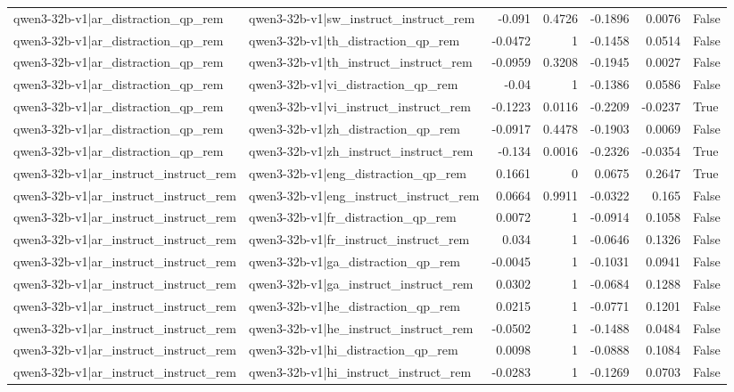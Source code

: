 \begin{table}
\begin{tabular}{l l r r r r l}
qwen3-32b-v1|ar_distraction_qp_rem & qwen3-32b-v1|sw_instruct_instruct_rem & -0.091 & 0.4726 & -0.1896 & 0.0076 & False \\
qwen3-32b-v1|ar_distraction_qp_rem & qwen3-32b-v1|th_distraction_qp_rem & -0.0472 & 1 & -0.1458 & 0.0514 & False \\
qwen3-32b-v1|ar_distraction_qp_rem & qwen3-32b-v1|th_instruct_instruct_rem & -0.0959 & 0.3208 & -0.1945 & 0.0027 & False \\
qwen3-32b-v1|ar_distraction_qp_rem & qwen3-32b-v1|vi_distraction_qp_rem & -0.04 & 1 & -0.1386 & 0.0586 & False \\
qwen3-32b-v1|ar_distraction_qp_rem & qwen3-32b-v1|vi_instruct_instruct_rem & -0.1223 & 0.0116 & -0.2209 & -0.0237 & True \\
qwen3-32b-v1|ar_distraction_qp_rem & qwen3-32b-v1|zh_distraction_qp_rem & -0.0917 & 0.4478 & -0.1903 & 0.0069 & False \\
qwen3-32b-v1|ar_distraction_qp_rem & qwen3-32b-v1|zh_instruct_instruct_rem & -0.134 & 0.0016 & -0.2326 & -0.0354 & True \\
qwen3-32b-v1|ar_instruct_instruct_rem & qwen3-32b-v1|eng_distraction_qp_rem & 0.1661 & 0 & 0.0675 & 0.2647 & True \\
qwen3-32b-v1|ar_instruct_instruct_rem & qwen3-32b-v1|eng_instruct_instruct_rem & 0.0664 & 0.9911 & -0.0322 & 0.165 & False \\
qwen3-32b-v1|ar_instruct_instruct_rem & qwen3-32b-v1|fr_distraction_qp_rem & 0.0072 & 1 & -0.0914 & 0.1058 & False \\
qwen3-32b-v1|ar_instruct_instruct_rem & qwen3-32b-v1|fr_instruct_instruct_rem & 0.034 & 1 & -0.0646 & 0.1326 & False \\
qwen3-32b-v1|ar_instruct_instruct_rem & qwen3-32b-v1|ga_distraction_qp_rem & -0.0045 & 1 & -0.1031 & 0.0941 & False \\
qwen3-32b-v1|ar_instruct_instruct_rem & qwen3-32b-v1|ga_instruct_instruct_rem & 0.0302 & 1 & -0.0684 & 0.1288 & False \\
qwen3-32b-v1|ar_instruct_instruct_rem & qwen3-32b-v1|he_distraction_qp_rem & 0.0215 & 1 & -0.0771 & 0.1201 & False \\
qwen3-32b-v1|ar_instruct_instruct_rem & qwen3-32b-v1|he_instruct_instruct_rem & -0.0502 & 1 & -0.1488 & 0.0484 & False \\
qwen3-32b-v1|ar_instruct_instruct_rem & qwen3-32b-v1|hi_distraction_qp_rem & 0.0098 & 1 & -0.0888 & 0.1084 & False \\
qwen3-32b-v1|ar_instruct_instruct_rem & qwen3-32b-v1|hi_instruct_instruct_rem & -0.0283 & 1 & -0.1269 & 0.0703 & False \\

\end{tabular}
\end{table}
